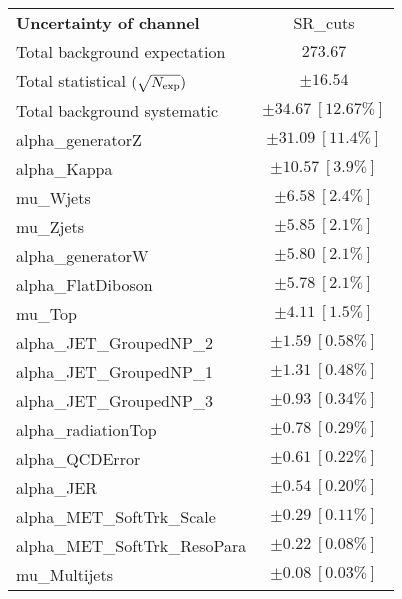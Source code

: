 
\begin{table}
\begin{center}
\setlength{\tabcolsep}{0.0pc}
\begin{tabular*}{\textwidth}{@{\extracolsep{\fill}}lc}
\noalign{\smallskip}\hline\noalign{\smallskip}
{\bf Uncertainty of channel}                                    & SR\_cuts            \\
\noalign{\smallskip}\hline\noalign{\smallskip}
Total background expectation             &  $273.67$       \\
\noalign{\smallskip}\hline\noalign{\smallskip}
Total statistical $(\sqrt{N_{\rm exp}})$              & $\pm 16.54$       \\
Total background systematic               & $\pm 34.67\ [12.67\%] $             \\
\noalign{\smallskip}\hline\noalign{\smallskip}
\noalign{\smallskip}\hline\noalign{\smallskip}
alpha\_generatorZ         & $\pm 31.09\ [11.4\%] $       \\
alpha\_Kappa         & $\pm 10.57\ [3.9\%] $       \\
mu\_Wjets         & $\pm 6.58\ [2.4\%] $       \\
mu\_Zjets         & $\pm 5.85\ [2.1\%] $       \\
alpha\_generatorW         & $\pm 5.80\ [2.1\%] $       \\
alpha\_FlatDiboson         & $\pm 5.78\ [2.1\%] $       \\
mu\_Top         & $\pm 4.11\ [1.5\%] $       \\
alpha\_JET\_GroupedNP\_2         & $\pm 1.59\ [0.58\%] $       \\
alpha\_JET\_GroupedNP\_1         & $\pm 1.31\ [0.48\%] $       \\
alpha\_JET\_GroupedNP\_3         & $\pm 0.93\ [0.34\%] $       \\
alpha\_radiationTop         & $\pm 0.78\ [0.29\%] $       \\
alpha\_QCDError         & $\pm 0.61\ [0.22\%] $       \\
alpha\_JER         & $\pm 0.54\ [0.20\%] $       \\
alpha\_MET\_SoftTrk\_Scale         & $\pm 0.29\ [0.11\%] $       \\
alpha\_MET\_SoftTrk\_ResoPara         & $\pm 0.22\ [0.08\%] $       \\
mu\_Multijets         & $\pm 0.08\ [0.03\%] $       \\

\end{tabular*}
\end{center}
\end{table}
